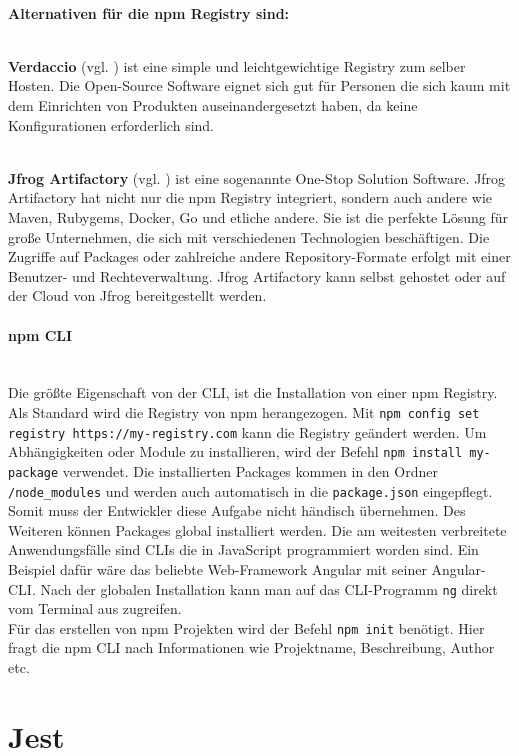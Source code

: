 \mbox{}\\
\textbf{Alternativen für die npm Registry sind:}

\mbox{}\\
\textbf{Verdaccio} (vgl. \cite{verdaccio_2021}) ist eine simple und leichtgewichtige Registry zum selber Hosten. Die Open-Source Software eignet sich gut für Personen die sich kaum mit dem Einrichten von Produkten auseinandergesetzt haben, da keine Konfigurationen erforderlich sind.

\mbox{}\\
\textbf{Jfrog Artifactory} (vgl. \cite{jfrog_2021}) ist eine sogenannte One-Stop Solution Software. Jfrog Artifactory hat nicht nur die npm Registry integriert, sondern auch andere wie Maven, Rubygems, Docker, Go und etliche andere. Sie ist die perfekte Lösung für große Unternehmen, die sich mit verschiedenen Technologien beschäftigen. Die Zugriffe auf Packages oder zahlreiche andere Repository-Formate erfolgt mit einer Benutzer- und Rechteverwaltung. Jfrog Artifactory kann selbst gehostet oder auf der Cloud von Jfrog bereitgestellt werden.

\paragraph{npm CLI}
\mbox{}\\
Die größte Eigenschaft von der CLI, ist die Installation von einer npm Registry. Als Standard wird die Registry von npm herangezogen. Mit \texttt{npm config set registry https://my-registry.com} kann die Registry geändert werden. Um Abhängigkeiten oder Module zu installieren, wird der Befehl \texttt{npm install my-package} verwendet. Die installierten Packages kommen in den Ordner \texttt{/node\_modules} und werden auch automatisch in die \texttt{package.json} eingepflegt. Somit muss der Entwickler diese Aufgabe nicht händisch übernehmen. Des Weiteren können Packages global installiert werden. Die am weitesten verbreitete Anwendungsfälle sind CLIs die in JavaScript programmiert worden sind. Ein Beispiel dafür wäre das beliebte Web-Framework Angular mit seiner Angular-CLI. Nach der globalen Installation kann man auf das CLI-Programm \texttt{ng} direkt vom Terminal aus zugreifen.
\\
Für das erstellen von npm Projekten wird der Befehl \texttt{npm init} benötigt. Hier fragt die npm CLI nach Informationen wie Projektname, Beschreibung, Author etc.

\section{Jest}

